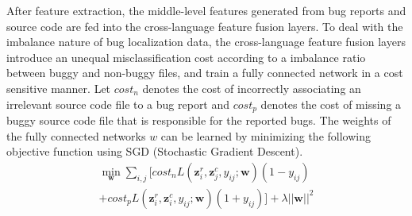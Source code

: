 After feature extraction, the middle-level features generated from bug reports and source code are fed into the cross-language feature fusion layers. To deal with the imbalance nature of bug localization data, the cross-language feature fusion layers introduce an unequal misclassification cost according to a imbalance ratio between buggy and non-buggy files, and train a fully connected network in a cost sensitive manner. Let $cost_n$ denotes the cost of incorrectly associating an irrelevant source code file to a bug report and $cost_p$ denotes the cost of missing a buggy source code file that is responsible for the reported bugs. The weights of the fully connected networks $w$ can be learned by minimizing the following objective function using SGD (Stochastic Gradient Descent).
\begin{equation}
\begin{aligned}
\label{eq:cost2}
\mathop{\min}_{\mathbf{w}}\sum_{i,j}{[cost_n L(\mathbf{z}^{r}_i, \mathbf{z}^{c}_j, y_{ij}; \mathbf{w})(1-y_{ij})} \\
 {+cost_p L(\mathbf{z}^{r}_i, \mathbf{z}^{c}_i, y_{ij}; \mathbf{w})(1+y_{ij})]}+\lambda||\mathbf{w}||^2
\end{aligned}
\end{equation}

